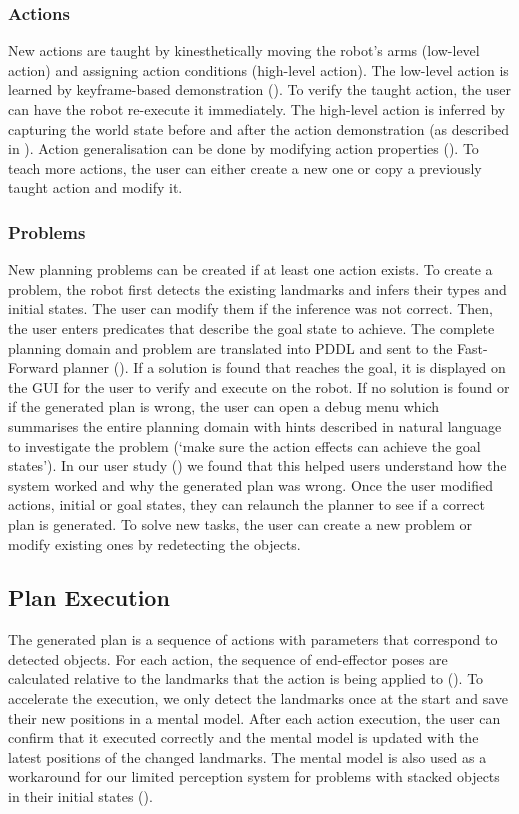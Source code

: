 \subsubsection{Actions} New actions are taught by kinesthetically moving the robot's arms (low-level action) and assigning action conditions (high-level action).
The low-level action is learned %
by keyframe-based demonstration ().
To verify the taught action, the user can have the robot re-execute it immediately.
The high-level action is inferred by capturing the world state before and after the action demonstration (as described in ).
Action generalisation can be done by modifying action properties ().
To teach more actions, the user can either create a new one or copy a previously taught action and modify it.
\subsubsection{Problems} New planning problems can be created if at least one action exists.
To create a problem, the robot first detects the existing landmarks and infers their types and initial states.
The user can modify them if the inference was not correct.
Then, the user enters predicates that describe the goal state to achieve.
The complete planning domain and problem are translated into PDDL and sent to the Fast-Forward planner (\cite{hoffmann2001ff}).
If a solution is found that reaches the goal, it is displayed on the GUI for the user to verify and execute on the robot.
If no solution is found or if the generated plan is wrong, the user can open a debug menu which summarises the entire planning domain with hints described in natural language to investigate the problem (\eg `make sure the action effects can achieve the goal states').
In our user study () we found that this helped users understand how the system worked and why the generated plan was wrong.
Once the user modified actions, initial or goal states, they can relaunch the planner to see if a correct plan is generated.
To solve new tasks, the user can create a new problem or modify existing ones by redetecting the objects.

\subsection{Plan Execution} 
The generated plan is a sequence of actions with parameters that correspond to detected objects.
For each action, the sequence of end-effector poses are calculated relative to the landmarks that the action is being applied to ().
To accelerate the execution, we only detect the landmarks once at the start and save their new positions in a mental model.
After each action execution, the user can confirm that it executed correctly and the mental model is updated with the latest positions of the changed landmarks.
The mental model is also used as a workaround for our limited perception system for problems with stacked objects in their initial states ().

